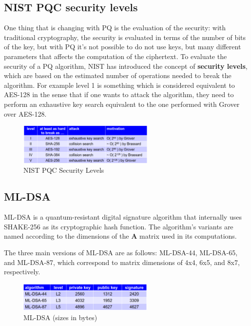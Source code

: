 \subsection{NIST PQC security levels}
One thing that is changing with PQ is the evaluation of the security:
with traditional cryptography, the security is evaluated in terms of 
the number of bits of the key, but with PQ it's not possible to do
not use keys, but many different parameters that affects the
computation of the ciphertext. To evaluate the security of a PQ 
algorithm, NIST has introduced the concept of \textbf{security
levels}, which are based on the estimated number of operations needed 
to break the algorithm. For example level 1 is something which is
considered equivalent to AES-128 in the sense that if one wants to
attack the algorithm, they need to perform an exhaustive key search
equivalent to the one performed with Grover over AES-128.

\begin{figure}[H]
  \centering
  \includegraphics[width=0.6\textwidth]{img/nist security levels.png}
  \caption{NIST PQC Security Levels}
\end{figure}

\subsection{ML-DSA}
ML-DSA is a quantum-resistant digital signature algorithm that
internally uses SHAKE-256 as its cryptographic hash function. The
algorithm's variants are named according to the dimensions of the
\textbf{A} matrix used in its computations. 

The three main versions of ML-DSA are as follows: 
ML-DSA-44, ML-DSA-65, and ML-DSA-87, which correspond to matrix
dimensions of 4x4, 6x5, and 8x7, respectively. 

\begin{figure}[H]
  \centering
  \includegraphics[width=0.6\textwidth]{img/mldsa.png}
  \caption{ML-DSA (sizes in bytes)}
\end{figure}

